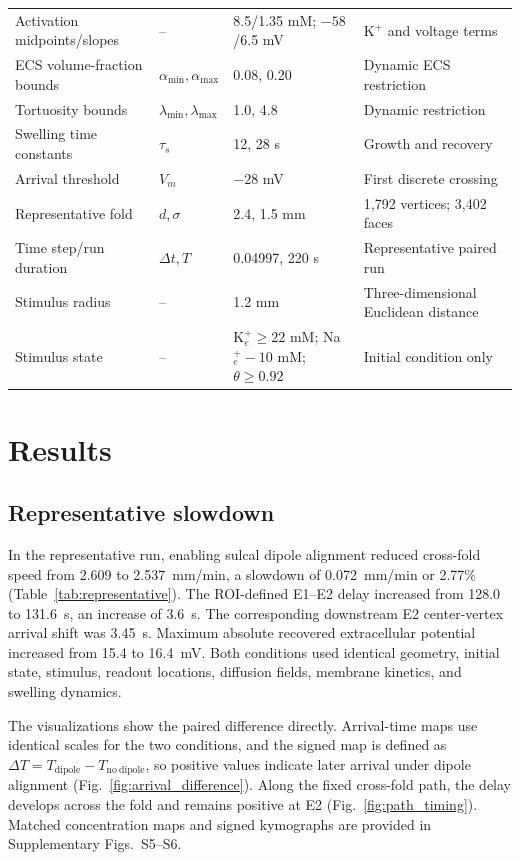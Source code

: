 \documentclass[12pt]{article}
\begin{document}
\begin{table}[t]
{\begin{tabular}{@{}llll@{}}
Activation midpoints/slopes & -- & 8.5/1.35 mM; $-58$/6.5 mV & K$^+$ and voltage terms \\
ECS volume-fraction bounds & $\alpha_{\min},\alpha_{\max}$ & 0.08, 0.20 & Dynamic ECS restriction \\
Tortuosity bounds & $\lambda_{\min},\lambda_{\max}$ & 1.0, 4.8 & Dynamic restriction \\
Swelling time constants & $\tau_s$ & 12, 28 s & Growth and recovery \\
Arrival threshold & $V_m$ & $-28$ mV & First discrete crossing \\
Representative fold & $d,\sigma$ & 2.4, 1.5 mm & 1,792 vertices; 3,402 faces \\
Time step/run duration & $\Delta t,T$ & 0.04997, 220 s & Representative paired run \\
Stimulus radius & -- & 1.2 mm & Three-dimensional Euclidean distance \\
Stimulus state & -- & K$^+_e\ge22$ mM; Na$^+_e-10$ mM; $\theta\ge0.92$ & Initial condition only \\
\bottomrule
\end{tabular}%
}
\endgroup
\end{table}

\section{Results}

\subsection{Representative slowdown}

In the representative run, enabling sulcal dipole alignment reduced cross-fold speed from 2.609 to 2.537~mm/min, a slowdown of 0.072~mm/min or 2.77\% (Table~\ref{tab:representative}). The ROI-defined E1--E2 delay increased from 128.0 to 131.6~s, an increase of 3.6~s. The corresponding downstream E2 center-vertex arrival shift was 3.45~s. Maximum absolute recovered extracellular potential increased from 15.4 to 16.4~mV. Both conditions used identical geometry, initial state, stimulus, readout locations, diffusion fields, membrane kinetics, and swelling dynamics.

The visualizations show the paired difference directly. Arrival-time maps use identical scales for the two conditions, and the signed map is defined as $\Delta T=T_{\mathrm{dipole}}-T_{\mathrm{no\ dipole}}$, so positive values indicate later arrival under dipole alignment (Fig.~\ref{fig:arrival_difference}). Along the fixed cross-fold path, the delay develops across the fold and remains positive at E2 (Fig.~\ref{fig:path_timing}). Matched concentration maps and signed kymographs are provided in Supplementary Figs.~S5--S6.
\end{document}
